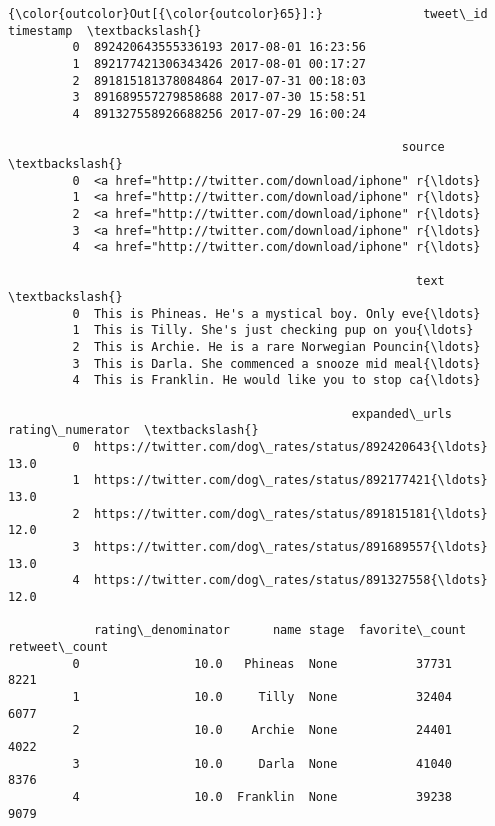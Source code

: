 \documentclass[11pt]{article}
\begin{document}
\begin{Verbatim}[commandchars=\\\{\}]
{\color{outcolor}Out[{\color{outcolor}65}]:}              tweet\_id           timestamp  \textbackslash{}
         0  892420643555336193 2017-08-01 16:23:56   
         1  892177421306343426 2017-08-01 00:17:27   
         2  891815181378084864 2017-07-31 00:18:03   
         3  891689557279858688 2017-07-30 15:58:51   
         4  891327558926688256 2017-07-29 16:00:24   
         
                                                       source  \textbackslash{}
         0  <a href="http://twitter.com/download/iphone" r{\ldots}   
         1  <a href="http://twitter.com/download/iphone" r{\ldots}   
         2  <a href="http://twitter.com/download/iphone" r{\ldots}   
         3  <a href="http://twitter.com/download/iphone" r{\ldots}   
         4  <a href="http://twitter.com/download/iphone" r{\ldots}   
         
                                                         text  \textbackslash{}
         0  This is Phineas. He's a mystical boy. Only eve{\ldots}   
         1  This is Tilly. She's just checking pup on you{\ldots}   
         2  This is Archie. He is a rare Norwegian Pouncin{\ldots}   
         3  This is Darla. She commenced a snooze mid meal{\ldots}   
         4  This is Franklin. He would like you to stop ca{\ldots}   
         
                                                expanded\_urls  rating\_numerator  \textbackslash{}
         0  https://twitter.com/dog\_rates/status/892420643{\ldots}              13.0   
         1  https://twitter.com/dog\_rates/status/892177421{\ldots}              13.0   
         2  https://twitter.com/dog\_rates/status/891815181{\ldots}              12.0   
         3  https://twitter.com/dog\_rates/status/891689557{\ldots}              13.0   
         4  https://twitter.com/dog\_rates/status/891327558{\ldots}              12.0   
         
            rating\_denominator      name stage  favorite\_count  retweet\_count  
         0                10.0   Phineas  None           37731           8221  
         1                10.0     Tilly  None           32404           6077  
         2                10.0    Archie  None           24401           4022  
         3                10.0     Darla  None           41040           8376  
         4                10.0  Franklin  None           39238           9079  
\end{Verbatim}
            
\end{document}
